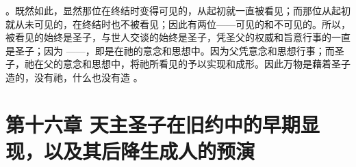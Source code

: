 。既然如此，显然那位在终结时变得可见的，从起初就一直被看见；而那位从起初就从未可见的，在终结时也不被看见；因此有两位——可见的和不可见的。所以，被看见的始终是圣子，与世人交谈的始终是圣子，凭圣父的权威和旨意行事的一直是圣子；因为  ——，即是在祂的意念和思想中。因为父凭意念和思想行事；而圣子，祂在父的意念和思想中，将祂所看见的予以实现和成形。因此万物是藉着圣子造的，没有祂，什么也没有造 。\par


\section{第十六章 天主圣子在旧约中的早期显现，以及其后降生成人的预演}

